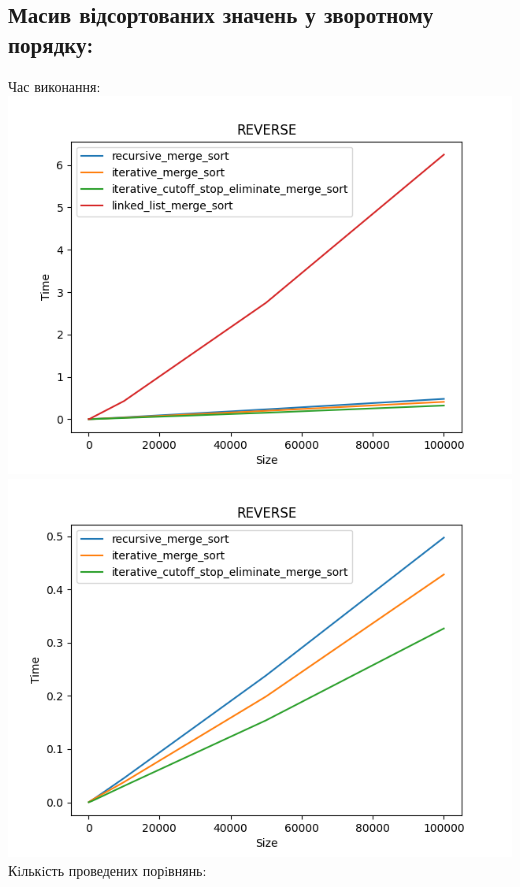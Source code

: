 \documentclass{article}
\begin{document}
    \subsection{Масив відсортованих значень у зворотному порядку:}
    Час виконання:
    \newline
        \includegraphics[scale=0.5]{reverse_Time_4_sorts_6_numbers_50_100to100000.png}
        \includegraphics[scale=0.5]{reverse_Time_3_sorts_6_numbers_50_100to100000.png}
    \newline
    Кiлькiсть проведених порiвнянь:
    \newline
\end{document}
